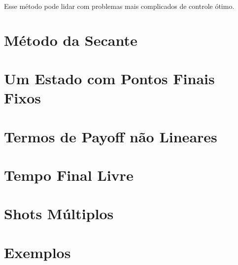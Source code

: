Esse método pode lidar com problemas mais complicados de controle ótimo. 

\section{Método da Secante}

\section{Um Estado com Pontos Finais Fixos}

\section{Termos de Payoff não Lineares}

\section{Tempo Final Livre}

\section{Shots Múltiplos}

\section{Exemplos}